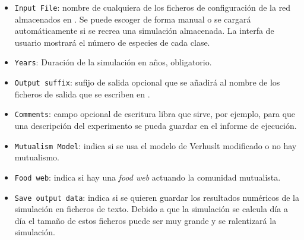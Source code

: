 \begin{itemize}
\item \texttt{Input File}: nombre de cualquiera de los ficheros de configuración de la red almacenados en . Se puede escoger de forma manual o se cargará automáticamente si se recrea una simulación almacenada. La interfa de usuario mostrará el número de especies de cada clase.

\item \texttt{Years}:  Duración de la simulación en años, obligatorio.

\item \texttt{Output suffix}: sufijo de salida opcional que se añadirá al nombre de los ficheros de salida que se escriben en  .

\item \texttt{Comments}: campo opcional de escritura libra que sirve, por ejemplo, para que una descripción del experimento se pueda guardar en el informe de ejecución.

\item \texttt{Mutualism Model}: indica si se usa el modelo de Verhuslt modificado o no hay mutualismo.

\item \texttt{Food web}: indica si hay una \textit{food web} actuando la comunidad mutualista.

\item \texttt{Save output data}: indica si se quieren guardar los resultados numéricos de la simulación en ficheros de texto. Debido a que la simulación se calcula día a día el tamaño de estos ficheros puede ser muy grande y se ralentizará la simulación.

\end{itemize}

